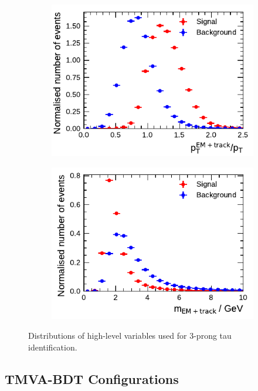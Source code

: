 \begin{figure}[htbp]
\begin{subfigure}{0.5\textwidth}
  \end{subfigure}%
  \begin{subfigure}{0.5\textwidth}
    \centering
    \includegraphics{./figures/baseline_bdt_vars/3p/ptRatioEflowApprox.pdf}
  \end{subfigure}
  \begin{subfigure}{0.5\textwidth}
    \centering
    \includegraphics{./figures/baseline_bdt_vars/3p/mEflowApprox.pdf}
  \end{subfigure}
  \caption[]{Distributions of high-level variables used for 3-prong tau
    identification.}
\end{figure}

\FloatBarrier
\subsection{TMVA-BDT Configurations}
\label{app:tmva_config}

